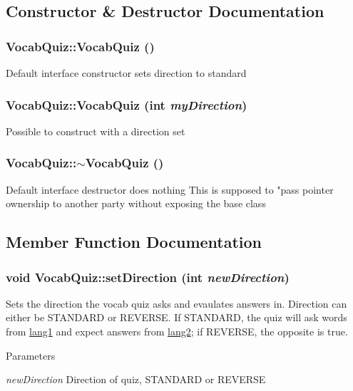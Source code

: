 \subsection{Constructor \& Destructor Documentation}
\hypertarget{classVocabQuiz_aa9f188fd46b6bfd21c8e1e3d5883d350}{
\subsubsection[{VocabQuiz}]{\setlength{\rightskip}{0pt plus 5cm}VocabQuiz::VocabQuiz ()}}
\label{classVocabQuiz_aa9f188fd46b6bfd21c8e1e3d5883d350}
Default interface constructor sets direction to standard \hypertarget{classVocabQuiz_a7c0575b4418431675956078c9b403166}{
\subsubsection[{VocabQuiz}]{\setlength{\rightskip}{0pt plus 5cm}VocabQuiz::VocabQuiz (int {\em myDirection})}}
\label{classVocabQuiz_a7c0575b4418431675956078c9b403166}
Possible to construct with a direction set \hypertarget{classVocabQuiz_a55c4c64161cc8e22643b0daa8dcf95a4}{
\subsubsection[{$\sim$VocabQuiz}]{\setlength{\rightskip}{0pt plus 5cm}VocabQuiz::$\sim$VocabQuiz ()}}
\label{classVocabQuiz_a55c4c64161cc8e22643b0daa8dcf95a4}
Default interface destructor does nothing This is supposed to "pass pointer ownership to another party without exposing the base class 

\subsection{Member Function Documentation}
\hypertarget{classVocabQuiz_ac9714af01fec150cdbb9d01ab305ff61}{
\subsubsection[{setDirection}]{\setlength{\rightskip}{0pt plus 5cm}void VocabQuiz::setDirection (int {\em newDirection})}}
\label{classVocabQuiz_ac9714af01fec150cdbb9d01ab305ff61}
Sets the direction the vocab quiz asks and evaulates answers in. Direction can either be STANDARD or REVERSE. If STANDARD, the quiz will ask words from \hyperlink{structlang1}{lang1} and expect answers from \hyperlink{structlang2}{lang2}; if REVERSE, the opposite is true. 
\begin{DoxyParams}{Parameters}
\item[{\em newDirection}]Direction of quiz, STANDARD or REVERSE \end{DoxyParams}


